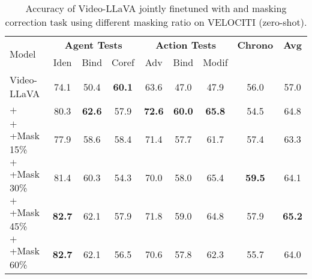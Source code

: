 \begin{table}[]
\centering
\footnotesize
\begin{tabular}{lccccccc>{\columncolor{gray!10}}c}
\toprule
\multirow{2}{*}{Model} & \multicolumn{3}{c}{\textbf{Agent Tests}}               & \multicolumn{3}{c}{\textbf{Action Tests}} & \textbf{Chrono} & \textbf{Avg} \\
& Iden          & Bind          & Coref         & Adv           & Bind          & Modif         &                         &                      \\
\midrule

\rowcolor[HTML]{F2F3F4} 
Video-LLaVA & 74.1 & 50.4 & \textbf{60.1} & 63.6 & 47.0 & 47.9 & 56.0 & 57.0  \\
\hdashline
\arrayrulecolor{black}
$+$ \method{} & 80.3 & \textbf{62.6} & 57.9 & \textbf{72.6} & \textbf{60.0} & \textbf{65.8} & 54.5 & 64.8 \\
$+$ \method{}+Mask 15\% & 77.9 & 58.6 & 58.4 & 71.4 & 57.7 & 61.7 & 57.4 & 63.3\\
$+$ \method{}+Mask 30\% & 81.4 & 60.3 & 54.3 & 70.0 & 58.0 & 65.4 & \textbf{59.5} & 64.1 \\
$+$ \method{}+Mask 45\% & \textbf{82.7} & 62.1 & 57.9 & 71.8 & 59.0 & 64.8 & 57.9 & \textbf{65.2} \\
$+$ \method{}+Mask 60\% & \textbf{82.7} & 62.1 & 56.5 & 70.6 & 57.8 & 62.3 & 55.7 & 64.0 \\

\bottomrule
\end{tabular}
\caption{Accuracy of Video-LLaVA jointly finetuned with \method{} and masking correction task using different masking ratio on VELOCITI (zero-shot).}
\label{table:mask_ratio}
\end{table}